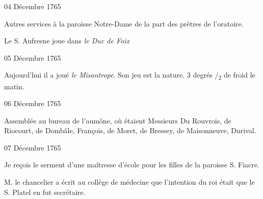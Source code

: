                      \begin{diary}{04 Décembre 1765}{}

                         Autres services à la paroisse Notre-Dame de la part
                           des prêtres de l'oratoire. \bigskip



                           Le S. Aufresne joue dans \emph{le Duc de Foix}
                        \bigskip


                     \end{diary}

                     \begin{diary}{05 Décembre 1765}{}

                         Aujourd'hui il a joué \emph{le Misantrope}. Son
                           jeu est la nature. 3 degrés
                              /\textsubscript{2} de froid le
                              matin. \bigskip


                     \end{diary}

                     \begin{diary}{06 Décembre 1765}{}

                         Assemblée au bureau de l'aumône, où
                           étaient Messieurs
                           Du Rouvrois, de Riocourt, de
                              Dombâle, François, de Moret,
                              de Bressey,
                           de Maisonneuve, Durival. \bigskip


                     \end{diary}

                     \begin{diary}{07 Décembre 1765}{}

                         Je reçois le serment d'une maîtresse
                           d'école
                           pour les filles de la paroisse S.
                              Fiacre. \bigskip



                           M. le chancelier a écrit au
                              collège de
                              médecine
                           que l'intention du roi
                           était que le S. Platel
                           en fut secrétaire. \bigskip


                     \end{diary}


